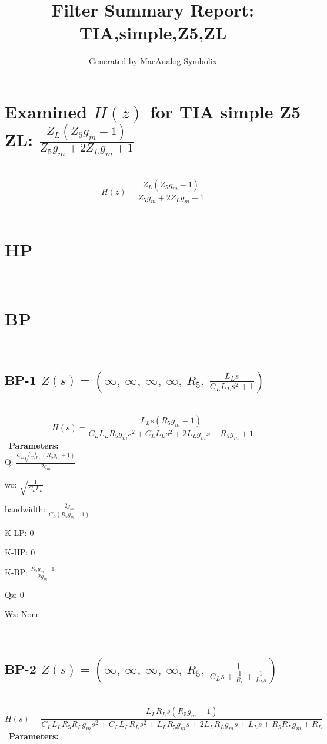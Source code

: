 \documentclass{article}
\begin{document}
        
                        \title{Filter Summary Report: TIA,simple,Z5,ZL}
                        \author{Generated by MacAnalog-Symbolix}
                        \maketitle

                        \tableofcontents
                        \newpage
                        \section{Examined $H(z)$ for TIA simple Z5 ZL: $\frac{Z_{L} \left(Z_{5} g_{m} - 1\right)}{Z_{5} g_{m} + 2 Z_{L} g_{m} + 1}$ }\ 
\textbf{\[H(z) = \frac{Z_{L} \left(Z_{5} g_{m} - 1\right)}{Z_{5} g_{m} + 2 Z_{L} g_{m} + 1}\] }\ 
\section{HP}\ 
\section{BP}\ 
\subsection{BP-1 $Z(s) = \left( \infty, \  \infty, \  \infty, \  \infty, \  R_{5}, \  \frac{L_{L} s}{C_{L} L_{L} s^{2} + 1}\right)$ } \ 
\textbf{\[H(s) = \frac{L_{L} s \left(R_{5} g_{m} - 1\right)}{C_{L} L_{L} R_{5} g_{m} s^{2} + C_{L} L_{L} s^{2} + 2 L_{L} g_{m} s + R_{5} g_{m} + 1}\] } \ 
\textbf{Parameters:}\\ 

Q: $\frac{C_{L} \sqrt{\frac{1}{C_{L} L_{L}}} \left(R_{5} g_{m} + 1\right)}{2 g_{m}}$\ 

wo: $\sqrt{\frac{1}{C_{L} L_{L}}}$\ 

bandwidth: $\frac{2 g_{m}}{C_{L} \left(R_{5} g_{m} + 1\right)}$\ 

K-LP: $0$\ 

K-HP: $0$\ 

K-BP: $\frac{R_{5} g_{m} - 1}{2 g_{m}}$\ 

Qz: $0$\ 

Wz: $\text{None}$\ 

\ 

\subsection{BP-2 $Z(s) = \left( \infty, \  \infty, \  \infty, \  \infty, \  R_{5}, \  \frac{1}{C_{L} s + \frac{1}{R_{L}} + \frac{1}{L_{L} s}}\right)$ } \ 
\textbf{\[H(s) = \frac{L_{L} R_{L} s \left(R_{5} g_{m} - 1\right)}{C_{L} L_{L} R_{5} R_{L} g_{m} s^{2} + C_{L} L_{L} R_{L} s^{2} + L_{L} R_{5} g_{m} s + 2 L_{L} R_{L} g_{m} s + L_{L} s + R_{5} R_{L} g_{m} + R_{L}}\] } \ 
\textbf{Parameters:}\\ 
\end{document}
